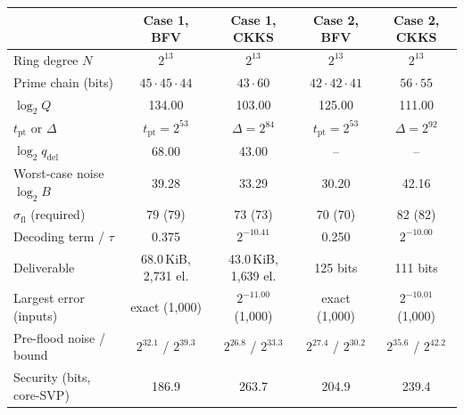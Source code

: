 \begin{tabular}{lcccc}
\toprule
 & Case 1, BFV & Case 1, CKKS & Case 2, BFV & Case 2, CKKS \\
\midrule
Ring degree $N$ & $2^{13}$ & $2^{13}$ & $2^{13}$ & $2^{13}$ \\
Prime chain (bits) & $45{\cdot}45{\cdot}44$ & $43{\cdot}60$ & $42{\cdot}42{\cdot}41$ & $56{\cdot}55$ \\
$\log_2 Q$ & 134.00 & 103.00 & 125.00 & 111.00 \\
$t_{\mathrm{pt}}$ or $\Delta$ & $t_{\mathrm{pt}}=2^{53}$ & $\Delta=2^{84}$ & $t_{\mathrm{pt}}=2^{53}$ & $\Delta=2^{92}$ \\
$\log_2 q_{\mathrm{del}}$ & 68.00 & 43.00 & -- & -- \\
Worst-case noise $\log_2 B$ & 39.28 & 33.29 & 30.20 & 42.16 \\
$\sigma_{\mathrm{fl}}$ (required) & 79 (79) & 73 (73) & 70 (70) & 82 (82) \\
Decoding term / $\tau$ & 0.375 & $2^{-10.41}$ & 0.250 & $2^{-10.00}$ \\
Deliverable & 68.0\,KiB, 2{,}731 el. & 43.0\,KiB, 1{,}639 el. & 125 bits & 111 bits \\
Largest error (inputs) & exact (1{,}000) & $2^{-11.00}$ (1{,}000) & exact (1{,}000) & $2^{-10.01}$ (1{,}000) \\
Pre-flood noise / bound & $2^{32.1}$ / $2^{39.3}$ & $2^{26.8}$ / $2^{33.3}$ & $2^{27.4}$ / $2^{30.2}$ & $2^{35.6}$ / $2^{42.2}$ \\
Security (bits, core-SVP) & 186.9 & 263.7 & 204.9 & 239.4 \\
\bottomrule
\end{tabular}
